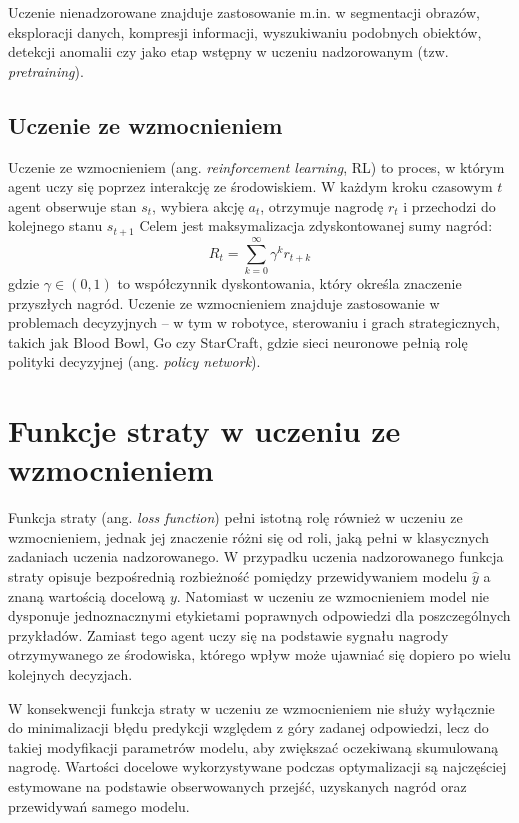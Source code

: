 Uczenie nienadzorowane znajduje zastosowanie m.in. w segmentacji obrazów, eksploracji danych, kompresji informacji, wyszukiwaniu podobnych obiektów, detekcji anomalii czy jako etap wstępny w uczeniu nadzorowanym (tzw. \textit{pretraining}).

\subsection*{Uczenie ze wzmocnieniem}

Uczenie ze wzmocnieniem (ang. \textit{reinforcement learning}, \acrshort{RL}) to proces, w którym agent uczy się poprzez interakcję ze środowiskiem. W każdym kroku czasowym $t$ agent obserwuje stan $s_t$, wybiera akcję $a_t$, otrzymuje nagrodę $r_t$ i przechodzi do kolejnego stanu $s_{t+1}$
Celem jest maksymalizacja zdyskontowanej sumy nagród:
\[
R_t = \sum_{k=0}^{\infty} \gamma^k r_{t+k}
\]
gdzie $\gamma \in (0,1)$ to współczynnik dyskontowania, który określa znaczenie przyszłych nagród.
Uczenie ze wzmocnieniem znajduje zastosowanie w problemach decyzyjnych – w tym w robotyce, sterowaniu i grach strategicznych, takich jak Blood Bowl, Go czy StarCraft, gdzie sieci neuronowe pełnią rolę polityki decyzyjnej (ang. \textit{policy network}).

\section{Funkcje straty w uczeniu ze wzmocnieniem}

Funkcja straty (ang. \textit{loss function}) pełni istotną rolę również w uczeniu ze wzmocnieniem, jednak jej znaczenie różni się od roli, jaką pełni w klasycznych zadaniach uczenia nadzorowanego. W przypadku uczenia nadzorowanego funkcja straty opisuje bezpośrednią rozbieżność pomiędzy przewidywaniem modelu $\hat{y}$ a znaną wartością docelową $y$. Natomiast w uczeniu ze wzmocnieniem model nie dysponuje jednoznacznymi etykietami poprawnych odpowiedzi dla poszczególnych przykładów. Zamiast tego agent uczy się na podstawie sygnału nagrody otrzymywanego ze środowiska, którego wpływ może ujawniać się dopiero po wielu kolejnych decyzjach. \cite{SuttonBarto2018}

W konsekwencji funkcja straty w uczeniu ze wzmocnieniem nie służy wyłącznie do minimalizacji błędu predykcji względem z góry zadanej odpowiedzi, lecz do takiej modyfikacji parametrów modelu, aby zwiększać oczekiwaną skumulowaną nagrodę. Wartości docelowe wykorzystywane podczas optymalizacji są najczęściej estymowane na podstawie obserwowanych przejść, uzyskanych nagród oraz przewidywań samego modelu.

